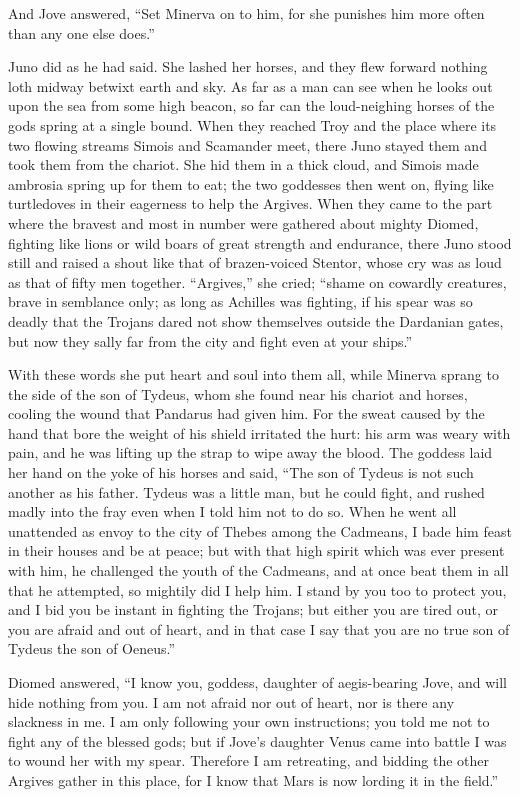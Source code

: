 And Jove answered, “Set Minerva on to him, for she punishes him more often
than any one else does.”

Juno did as he had said. She lashed her horses, and they flew forward
nothing loth midway betwixt earth and sky. As far as a man can see when he
looks out upon the sea from some high beacon, so far can the loud-neighing
horses of the gods spring at a single bound. When they reached Troy and
the place where its two flowing streams Simois and Scamander meet, there
Juno stayed them and took them from the chariot. She hid them in a thick
cloud, and Simois made ambrosia spring up for them to eat; the two
goddesses then went on, flying like turtledoves in their eagerness to help
the Argives. When they came to the part where the bravest and most in
number were gathered about mighty Diomed, fighting like lions or wild
boars of great strength and endurance, there Juno stood still and raised a
shout like that of brazen-voiced Stentor, whose cry was as loud as that of
fifty men together. “Argives,” she cried; “shame on cowardly creatures,
brave in semblance only; as long as Achilles was fighting, if his spear
was so deadly that the Trojans dared not show themselves outside the
Dardanian gates, but now they sally far from the city and fight even at
your ships.”

With these words she put heart and soul into them all, while Minerva
sprang to the side of the son of Tydeus, whom she found near his chariot
and horses, cooling the wound that Pandarus had given him. For the sweat
caused by the hand that bore the weight of his shield irritated the hurt:
his arm was weary with pain, and he was lifting up the strap to wipe away
the blood. The goddess laid her hand on the yoke of his horses and said,
“The son of Tydeus is not such another as his father. Tydeus was a little
man, but he could fight, and rushed madly into the fray even when I told
him not to do so. When he went all unattended as envoy to the city of
Thebes among the Cadmeans, I bade him feast in their houses and be at
peace; but with that high spirit which was ever present with him, he
challenged the youth of the Cadmeans, and at once beat them in all that he
attempted, so mightily did I help him. I stand by you too to protect you,
and I bid you be instant in fighting the Trojans; but either you are tired
out, or you are afraid and out of heart, and in that case I say that you
are no true son of Tydeus the son of Oeneus.”

Diomed answered, “I know you, goddess, daughter of aegis-bearing Jove, and
will hide nothing from you. I am not afraid nor out of heart, nor is there
any slackness in me. I am only following your own instructions; you told
me not to fight any of the blessed gods; but if Jove’s daughter Venus came
into battle I was to wound her with my spear. Therefore I am retreating,
and bidding the other Argives gather in this place, for I know that Mars
is now lording it in the field.”

